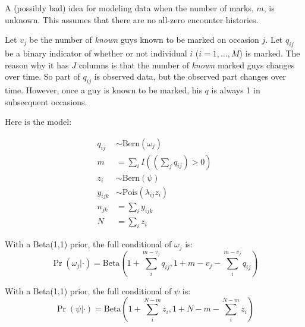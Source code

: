 \documentclass[12pt]{article}
\begin{document}
A (possibly bad) idea for modeling data when the number of marks, $m$, is
unknown. This assumes that there are no all-zero encounter histories.

Let $v_j$ be the number of \textit{known} guys known to be marked on
occasion $j$. Let $q_{ij}$ be a binary indicator of whether or not individual $i$
($i=1,\ldots,M$) is marked. The reason why it has $J$ columns is that
the number of \textit{known} marked guys changes over time. So part of
$q_{ij}$ is observed data, but the observed part changes over time.
However, once a
guy is known to be marked, his $q$ is always 1 in subsecquent occasions.

Here is the model:

\begin{align*}
q_{ij} &\sim \text{Bern}(\omega_j) \\
m &= \sum_i I((\sum_j q_{ij})>0) \\
z_i &\sim \text{Bern}(\psi) \\
y_{ijk} &\sim \text{Pois}(\lambda_{ij}z_{i}) \\
n_{jk} &= \sum_i y_{ijk} \\
N &= \sum_i z_i
\end{align*}

With a Beta(1,1) prior, the full conditional of $\omega_j$ is:
\[
\Pr(\omega_j|\cdot) = \text{Beta}(1+\sum_i^{m-v_j} q_{ij}, 1+m-v_j-\sum_i^{m-v_j}q_{ij})
\]

With a Beta(1,1) prior, the full conditional of $\psi$ is:
\[
\Pr(\psi|\cdot) = \text{Beta}(1+\sum_i^{N-m} z_{i}, 1+N-m-\sum_i^{N-m}z_i)
\]
\end{document}
